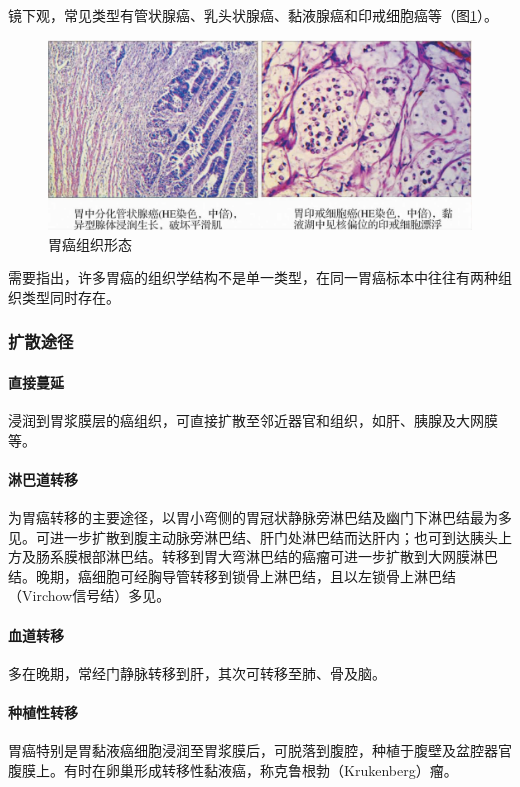 镜下观，常见类型有管状腺癌、乳头状腺癌、黏液腺癌和印戒细胞癌等（图\ref{fig8-5}）。

\begin{figure}[!htbp]
 \centering
 \includegraphics{./images/Image00131.jpg}
 \captionsetup{justification=centering}
 \caption{胃癌组织形态}
 \label{fig8-5}
  \end{figure} 

需要指出，许多胃癌的组织学结构不是单一类型，在同一胃癌标本中往往有两种组织类型同时存在。

\subsubsection{扩散途径}

\paragraph{直接蔓延}
浸润到胃浆膜层的癌组织，可直接扩散至邻近器官和组织，如肝、胰腺及大网膜等。

\paragraph{淋巴道转移}
为胃癌转移的主要途径，以胃小弯侧的胃冠状静脉旁淋巴结及幽门下淋巴结最为多见。可进一步扩散到腹主动脉旁淋巴结、肝门处淋巴结而达肝内；也可到达胰头上方及肠系膜根部淋巴结。转移到胃大弯淋巴结的癌瘤可进一步扩散到大网膜淋巴结。晚期，癌细胞可经胸导管转移到锁骨上淋巴结，且以左锁骨上淋巴结（Virchow信号结）多见。

\paragraph{血道转移}
多在晚期，常经门静脉转移到肝，其次可转移至肺、骨及脑。

\paragraph{种植性转移}
胃癌特别是胃黏液癌细胞浸润至胃浆膜后，可脱落到腹腔，种植于腹壁及盆腔器官腹膜上。有时在卵巢形成转移性黏液癌，称克鲁根勃（Krukenberg）瘤。

